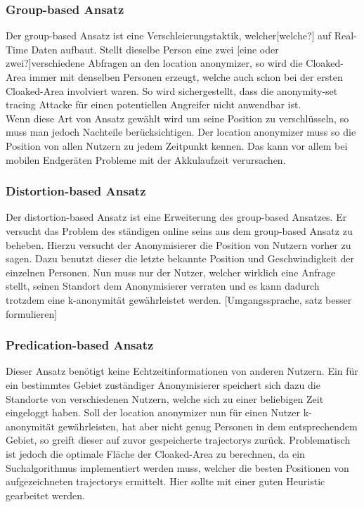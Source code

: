 \subsubsection{Group-based Ansatz} 
Der group-based Ansatz ist eine Verschleierungstaktik, welcher[welche?] auf Real-Time Daten aufbaut. Stellt dieselbe Person eine zwei [eine oder zwei?]verschiedene Abfragen an den location anonymizer, so wird die Cloaked-Area immer mit denselben Personen erzeugt, welche auch schon bei der ersten Cloaked-Area involviert waren. So wird sichergestellt, dass die anonymity-set tracing Attacke für einen potentiellen Angreifer nicht anwendbar ist.\\Wenn diese Art von Ansatz gewählt wird um seine Position zu verschlüsseln, so muss man jedoch Nachteile berücksichtigen. Der location anonymizer muss so die Position von allen Nutzern zu jedem Zeitpunkt kennen. Das kann vor allem bei mobilen Endgeräten Probleme mit der Akkulaufzeit verursachen.  
\subsubsection{Distortion-based Ansatz} 
Der distortion-based Ansatz ist eine Erweiterung des group-based Ansatzes. Er versucht das Problem des ständigen online seins aus dem group-based Ansatz zu beheben. Hierzu versucht der Anonymisierer die Position von Nutzern vorher zu sagen. Dazu benutzt dieser die letzte bekannte Position und Geschwindigkeit der einzelnen Personen. Nun muss nur der Nutzer, welcher wirklich eine Anfrage stellt, seinen Standort dem Anonymisierer verraten und es kann dadurch trotzdem eine k-anonymität gewährleistet werden. [Umgangssprache, satz besser formulieren] 
\subsubsection{Predication-based Ansatz} 
Dieser Ansatz benötigt keine Echtzeitinformationen von anderen Nutzern. Ein für ein bestimmtes Gebiet zuständiger Anonymisierer speichert sich dazu die Standorte von verschiedenen Nutzern, welche sich zu einer beliebigen Zeit eingeloggt haben. Soll der location anonymizer nun für einen Nutzer k-anonymität gewährleisten, hat aber nicht genug Personen in dem entsprechendem Gebiet, so greift dieser auf zuvor gespeicherte trajectorys zurück. Problematisch ist jedoch die optimale Fläche der Cloaked-Area zu berechnen, da ein Suchalgorithmus implementiert werden muss, welcher die besten Positionen von aufgezeichneten trajectorys ermittelt. Hier sollte mit einer guten Heuristic gearbeitet werden. 
